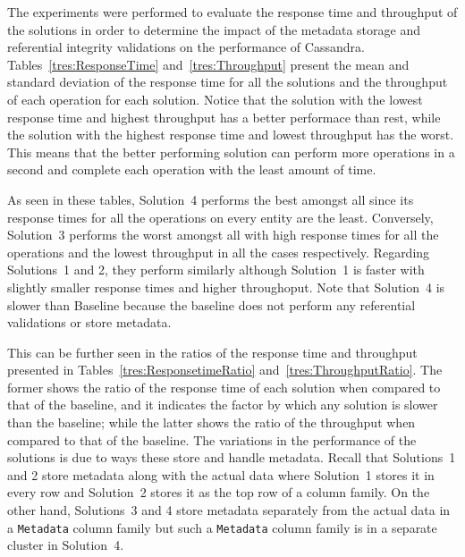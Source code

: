 The experiments were performed to evaluate the response time and throughput of
the solutions in order to determine the impact of the metadata storage and
referential integrity validations on the performance of Cassandra.
Tables~\ref{tres:ResponseTime} and~\ref{tres:Throughput} present the mean and
standard deviation of the response time for all the solutions and the throughput
of each operation for each solution. Notice that the solution with the lowest
response time and highest throughput has a better performace than rest, while
the solution with the highest response time and lowest throughput has the worst.
This means that the better performing solution can perform more operations in a
second and complete each operation with the least amount of time.



As seen in these tables, Solution~4 performs the best amongst all since its
response times for all the  operations on every entity are the least.
Conversely, Solution~3 performs the worst amongst all with high response times
for all the operations and the lowest throughput in all the cases respectively.
Regarding Solutions~1 and 2, they perform similarly although Solution~1 is
faster with slightly smaller response times and higher throughoput. Note that
Solution~4 is slower than  Baseline  because the baseline does not perform any
referential validations or store metadata.

This can be further seen in the ratios of the response time and throughput
presented in Tables~\ref{tres:ResponsetimeRatio} and~\ref{tres:ThroughputRatio}.
The former shows the ratio of the response time of each solution when compared
to that of the baseline, and it indicates the factor by which any solution is
slower than the baseline;  while
the latter shows the ratio of the throughput when compared to that of the
baseline.
The variations in the performance of the solutions is due to ways these store
and handle metadata. Recall that Solutions~1 and 2 store metadata along with the
actual data where Solution~1 stores it in every row and Solution~2 stores it as
the top row of a column family. On the other hand, Solutions~3 and 4 store
metadata separately from the actual data  in a \texttt{Metadata} column family
but such a  \texttt{Metadata} column family is in a separate cluster in
Solution~4.

